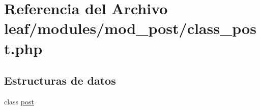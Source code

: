 \hypertarget{class__post_8php}{\section{Referencia del Archivo leaf/modules/mod\-\_\-post/class\-\_\-post.php}
\label{class__post_8php}
}
\subsection*{Estructuras de datos}
\begin{DoxyCompactItemize}
\item 
class \hyperlink{classpost}{post}
\end{DoxyCompactItemize}
